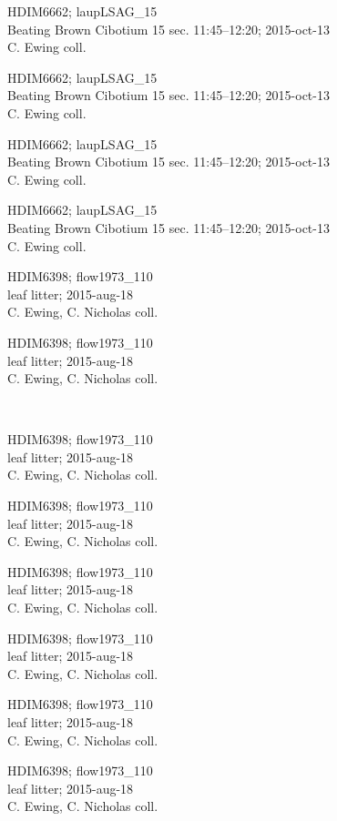 \documentclass[2pt]{extarticle}
\begin{document}
\noindent
\parbox{0.16\textwidth}{\tiny \raggedright \rule[-0.3\baselineskip]{0pt}{10pt}HDIM6662; laupLSAG\_15\\ Beating Brown Cibotium 15 sec. 11:45--12:20; 2015-oct-13\\ C. Ewing coll.}
\parbox{0.16\textwidth}{\tiny \raggedright \rule[-0.3\baselineskip]{0pt}{10pt}HDIM6662; laupLSAG\_15\\ Beating Brown Cibotium 15 sec. 11:45--12:20; 2015-oct-13\\ C. Ewing coll.}
\parbox{0.16\textwidth}{\tiny \raggedright \rule[-0.3\baselineskip]{0pt}{10pt}HDIM6662; laupLSAG\_15\\ Beating Brown Cibotium 15 sec. 11:45--12:20; 2015-oct-13\\ C. Ewing coll.}
\parbox{0.16\textwidth}{\tiny \raggedright \rule[-0.3\baselineskip]{0pt}{10pt}HDIM6662; laupLSAG\_15\\ Beating Brown Cibotium 15 sec. 11:45--12:20; 2015-oct-13\\ C. Ewing coll.}
\parbox{0.16\textwidth}{\tiny \raggedright \rule[-0.3\baselineskip]{0pt}{10pt}HDIM6398; flow1973\_110\\ leaf litter; 2015-aug-18\\ C. Ewing, C. Nicholas coll.}
\parbox{0.16\textwidth}{\tiny \raggedright \rule[-0.3\baselineskip]{0pt}{10pt}HDIM6398; flow1973\_110\\ leaf litter; 2015-aug-18\\ C. Ewing, C. Nicholas coll.} \\ 
\vspace{0.001in} 

\noindent
\parbox{0.16\textwidth}{\tiny \raggedright \rule[-0.3\baselineskip]{0pt}{10pt}HDIM6398; flow1973\_110\\ leaf litter; 2015-aug-18\\ C. Ewing, C. Nicholas coll.}
\parbox{0.16\textwidth}{\tiny \raggedright \rule[-0.3\baselineskip]{0pt}{10pt}HDIM6398; flow1973\_110\\ leaf litter; 2015-aug-18\\ C. Ewing, C. Nicholas coll.}
\parbox{0.16\textwidth}{\tiny \raggedright \rule[-0.3\baselineskip]{0pt}{10pt}HDIM6398; flow1973\_110\\ leaf litter; 2015-aug-18\\ C. Ewing, C. Nicholas coll.}
\parbox{0.16\textwidth}{\tiny \raggedright \rule[-0.3\baselineskip]{0pt}{10pt}HDIM6398; flow1973\_110\\ leaf litter; 2015-aug-18\\ C. Ewing, C. Nicholas coll.}
\parbox{0.16\textwidth}{\tiny \raggedright \rule[-0.3\baselineskip]{0pt}{10pt}HDIM6398; flow1973\_110\\ leaf litter; 2015-aug-18\\ C. Ewing, C. Nicholas coll.}
\parbox{0.16\textwidth}{\tiny \raggedright \rule[-0.3\baselineskip]{0pt}{10pt}HDIM6398; flow1973\_110\\ leaf litter; 2015-aug-18\\ C. Ewing, C. Nicholas coll.} \\ 
\vspace{0.001in} 
\end{document}
